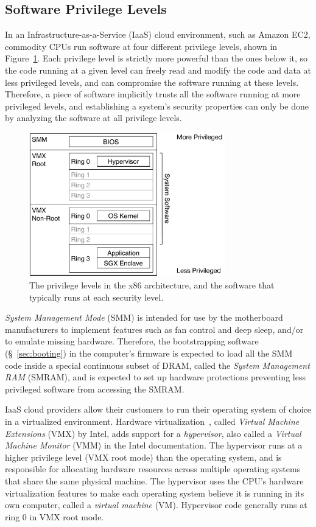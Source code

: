 \subsection{Software Privilege Levels}
\label{sec:rings}

In an Infrastructure-as-a-Service (IaaS) cloud environment, such as Amazon EC2,
commodity CPUs run software at four different privilege levels, shown in
Figure~\ref{fig:cpu_rings}. Each privilege level is strictly more powerful than
the ones below it, so the code running at a given level can freely read and
modify the code and data at less privileged levels, and can compromise the
software running at these levels. Therefore, a piece of software implicitly
trusts all the software running at more privileged levels, and establishing a
system's security properties can only be done by analyzing the software at all
privilege levels.

\begin{figure}[hbtp]
  \centering
  \includegraphics[width=85mm]{figures/cpu_rings.pdf}
  \caption{
    The privilege levels in the x86 architecture, and the software that
    typically runs at each security level.
  }
  \label{fig:cpu_rings}
\end{figure}


\textit{System Management Mode} (SMM) is intended for use by the motherboard
manufacturers to implement features such as fan control and deep sleep, and/or
to emulate missing hardware. Therefore, the bootstrapping software
(\S~\ref{sec:booting}) in the computer's firmware is expected to load all the
SMM code inside a special continuous subset of DRAM, called the \textit{System
Management RAM} (SMRAM), and is expected to set up hardware protections
preventing less privileged software from accessing the SMRAM.

IaaS cloud providers allow their customers to run their operating system of
choice in a virtualized environment. Hardware
virtualization~\cite{uhlig2005vmx}, called \textit{Virtual Machine Extensions}
(VMX) by Intel, adds support for a \textit{hypervisor}, also called a
\textit{Virtual Machine Monitor} (VMM) in the Intel documentation. The
hypervisor runs at a higher privilege level (VMX root mode) than the operating
system, and is responsible for allocating hardware resources across multiple
operating systems that share the same physical machine. The hypervisor uses the
CPU's hardware virtualization features to make each operating system believe it
is running in its own computer, called a \textit{virtual machine} (VM).
Hypervisor code generally runs at ring 0 in VMX root mode.


